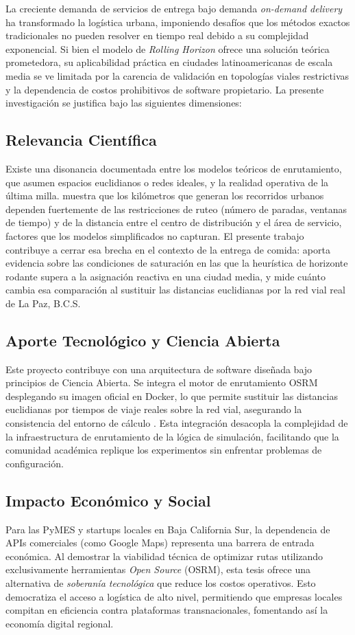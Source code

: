 \documentclass[12pt,letterpaper,oneside]{book}
\begin{document}
La creciente demanda de servicios de entrega bajo demanda \textit{on-demand delivery} ha transformado la logística urbana,
imponiendo desafíos que los métodos exactos tradicionales no pueden resolver en tiempo real debido a su complejidad 
exponencial. Si bien el modelo de \textit{Rolling Horizon} \citep{Reyes2018} ofrece una solución teórica prometedora,
su aplicabilidad práctica en ciudades latinoamericanas de escala media se ve limitada por la carencia de validación
en topologías viales restrictivas y la dependencia de costos prohibitivos de software propietario. La presente
investigación se justifica bajo las siguientes dimensiones:

\subsection{Relevancia Científica}
Existe una disonancia documentada entre los modelos teóricos de enrutamiento, que asumen espacios euclidianos o redes
ideales, y la realidad operativa de la última milla. \citet{Figliozzi2007} muestra que los kilómetros que
generan los recorridos urbanos dependen fuertemente de las restricciones de ruteo (número de paradas, ventanas de
tiempo) y de la distancia entre el centro de distribución y el área de servicio, factores que los modelos
simplificados no capturan. El presente trabajo contribuye a cerrar esa brecha en el contexto de la
entrega de comida: aporta evidencia sobre las condiciones de saturación en las que la heurística de
horizonte rodante supera a la asignación reactiva en una ciudad media, y mide cuánto cambia esa
comparación al sustituir las distancias euclidianas por la red vial real de La Paz, B.C.S.

\subsection{Aporte Tecnológico y Ciencia Abierta}
Este proyecto contribuye con una arquitectura de software diseñada bajo principios de Ciencia Abierta. Se integra el 
motor de enrutamiento OSRM desplegando su imagen oficial en Docker, lo que permite sustituir las distancias euclidianas por tiempos de viaje reales sobre la red vial, asegurando la consistencia del entorno de cálculo \citep{Merkel2014}. Esta integración desacopla la complejidad de la infraestructura de enrutamiento de la lógica de simulación, facilitando que la comunidad académica replique los experimentos sin enfrentar problemas de configuración.

\subsection{Impacto Económico y Social}
Para las PyMES y startups locales en Baja California Sur, la dependencia de APIs comerciales (como Google Maps) 
representa una barrera de entrada económica. Al demostrar la viabilidad técnica de optimizar rutas utilizando
exclusivamente herramientas \textit{Open Source} (OSRM), esta tesis ofrece una alternativa de \textit{soberanía tecnológica}
que reduce los costos operativos. Esto democratiza el acceso a logística de alto nivel, permitiendo que empresas
locales compitan en eficiencia contra plataformas transnacionales, fomentando así la economía digital regional.
\end{document}

